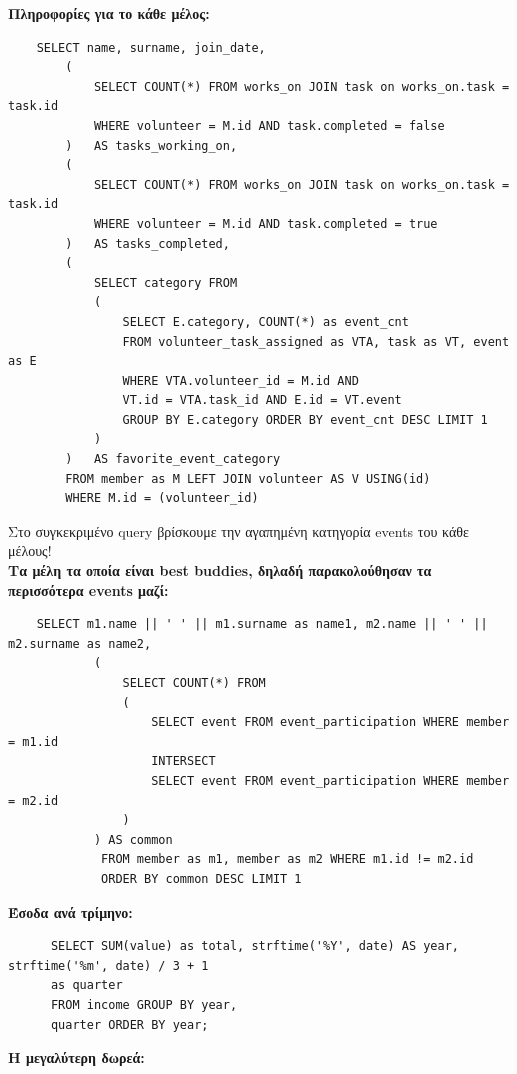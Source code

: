\documentclass[manuscript,screen,review]{acmart}
\newcommand{\en}[1]{\foreignlanguage{english}{#1}}
\begin{document}
\newpage
\textbf{Πληροφορίες για το κάθε μέλος:}
    \begin{lstlisting}
    SELECT name, surname, join_date, 
        (
            SELECT COUNT(*) FROM works_on JOIN task on works_on.task = task.id
            WHERE volunteer = M.id AND task.completed = false
        )   AS tasks_working_on, 
        (
            SELECT COUNT(*) FROM works_on JOIN task on works_on.task = task.id
            WHERE volunteer = M.id AND task.completed = true
        )   AS tasks_completed,
        (
            SELECT category FROM 
            (
                SELECT E.category, COUNT(*) as event_cnt
                FROM volunteer_task_assigned as VTA, task as VT, event as E 
                WHERE VTA.volunteer_id = M.id AND
                VT.id = VTA.task_id AND E.id = VT.event 
                GROUP BY E.category ORDER BY event_cnt DESC LIMIT 1
            )
        )   AS favorite_event_category
        FROM member as M LEFT JOIN volunteer AS V USING(id)
        WHERE M.id = (volunteer_id)
    \end{lstlisting}
    
    Στο συγκεκριμένο \en{query} βρίσκουμε την αγαπημένη κατηγορία \en{events} του κάθε μέλους!\\
\textbf{Τα μέλη τα οποία είναι \en{best buddies}, δηλαδή παρακολούθησαν τα περισσότερα \en{events} μαζί:}
    \begin{lstlisting}
    SELECT m1.name || ' ' || m1.surname as name1, m2.name || ' ' || m2.surname as name2, 
            (
                SELECT COUNT(*) FROM 
                (
                    SELECT event FROM event_participation WHERE member = m1.id
                    INTERSECT
                    SELECT event FROM event_participation WHERE member = m2.id
                )
            ) AS common
             FROM member as m1, member as m2 WHERE m1.id != m2.id
             ORDER BY common DESC LIMIT 1
    \end{lstlisting}

\newpage
\textbf{Έσοδα ανά τρίμηνο:}
    \begin{lstlisting}
      SELECT SUM(value) as total, strftime('%Y', date) AS year, strftime('%m', date) / 3 + 1
      as quarter
      FROM income GROUP BY year, 
      quarter ORDER BY year;
    \end{lstlisting}

\textbf{Η μεγαλύτερη δωρεά:}
\end{document}
